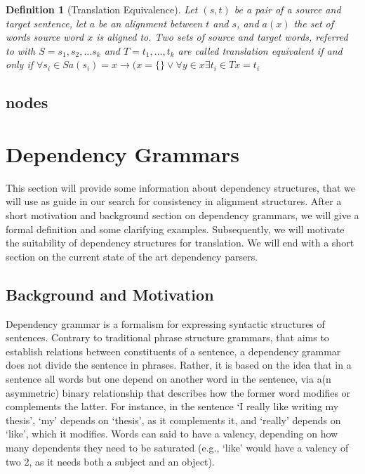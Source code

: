 \documentclass{report}
\theoremstyle{definition}
\theoremstyle{plain}
\newtheorem{definition}{Definition}
\begin{document}
\begin{definition}[Translation Equivalence]
Let $(s,t)$ be a pair of a source and target sentence, let $a$ be an alignment between $t$ and $s$, and $a(x)$ the set of words source word $x$ is aligned to. Two sets of source and target words, referred to with $S = s_1,s_2,\ldots s_k$ and $T = t_1,\ldots,t_k$ are called translation equivalent if and only if $\forall s_i\in S a(s_i)  = x \rightarrow (x = \{\} \lor \forall y \in x \exists t_i\in T x = t_i$
\end{definition}





\subsection{nodes}






\newpage

\section{Dependency Grammars}
\label{sec:depgram}

This section will provide some information about dependency structures, that we will use as guide in our search for consistency in alignment structures. After a short motivation and background section on dependency grammars, we will give a formal definition and some clarifying examples. Subsequently, we will motivate the suitability of dependency structures for translation. We will end with a short section on the current state of the art dependency parsers.

\subsection{Background and Motivation}

Dependency grammar is a formalism for expressing syntactic structures of sentences. Contrary to traditional phrase structure grammars, that aims to establish relations between constituents of a sentence, a dependency grammar does not divide the sentence in phrases. Rather, it is based on the idea that in a sentence all words but one depend on another word in the sentence, via a(n asymmetric) binary relationship that describes how the former word modifies or complements the latter. For instance, in the sentence `I really like writing my thesis', `my' depends on `thesis', as it complements it, and `really' depends on `like', which it modifies. Words can said to have a valency, depending on how many dependents they need to be saturated (e.g., `like' would have a valency of two 2, as it needs both a subject and an object).
\end{document}
